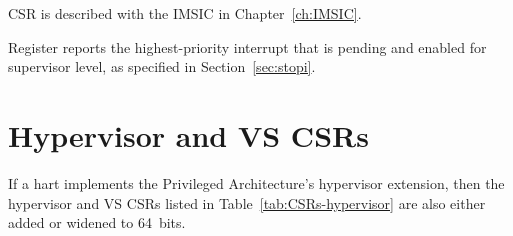 CSR  is described with the IMSIC in Chapter~\ref{ch:IMSIC}.

Register  reports the highest-priority interrupt that
is pending and enabled for supervisor level, as specified in
Section~\ref{sec:stopi}.

\section{Hypervisor and VS CSRs}
\label{ch:CSRs-hypervisor}

If a hart implements the Privileged Architecture's hypervisor
extension, then the hypervisor and VS CSRs listed in
Table~\ref{tab:CSRs-hypervisor} are also either added
or widened to 64~bits.

